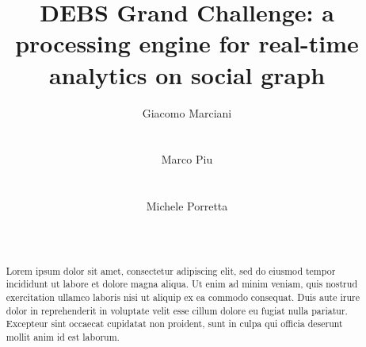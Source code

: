 \documentclass{sig-alternate-05-2015}
\begin{document}






\title{DEBS Grand Challenge: a processing engine for real-time analytics on social graph}

\author{
\alignauthor
Giacomo Marciani\\
\\
\\
\alignauthor
Marco Piu\\
\\
\\
\alignauthor
Michele Porretta\\
\\
\\
}

\maketitle

\begin{abstract}
Lorem ipsum dolor sit amet, consectetur adipiscing elit, sed do eiusmod tempor incididunt ut labore et dolore magna aliqua. Ut enim ad minim veniam, quis nostrud exercitation ullamco laboris nisi ut aliquip ex ea commodo consequat. Duis aute irure dolor in reprehenderit in voluptate velit esse cillum dolore eu fugiat nulla pariatur. Excepteur sint occaecat cupidatat non proident, sunt in culpa qui officia deserunt mollit anim id est laborum.
\end{abstract}
\end{document}
